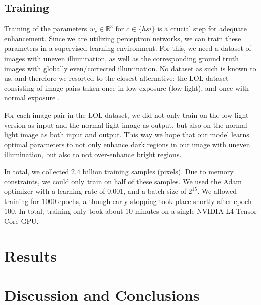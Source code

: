 \documentclass[sigconf]{acmart}
\begin{document}
\begin{mdframed}[backgroundcolor=backcolour,leftmargin=0cm,hidealllines=true,innerleftmargin=0cm,innerrightmargin=0cm,innertopmargin=0cm,innerbottommargin=-0.65cm]

\end{mdframed}

\subsection{Training}\label{sec:training}
Training of the parameters $w_{c} \in \mathbb{R}^3$ for $c \in \{hsi\}$ is a crucial step for adequate enhancement. Since we are utilizing perceptron networks, we can train these parameters in a supervised learning environment. For this, we need a dataset of images with uneven illumination, as well as the corresponding ground truth images with globally even/corrected illumination. No dataset as such is known to us, and therefore we resorted to the closest alternative: the LOL-dataset consisting of image pairs taken once in low exposure (low-light), and once with normal exposure \cite{wei2018deep}.

For each image pair in the LOL-dataset, we did not only train on the low-light version as input and the normal-light image as output, but also on the normal-light image as both input and output. This way we hope that our model learns optimal parameters to not only enhance dark regions in our image with uneven illumination, but also to not over-enhance bright regions.

In total, we collected $2.4$ billion training samples (pixels). Due to memory constraints, we could only train on half of these samples. We used the Adam optimizer with a learning rate of $0.001$, and a batch size of $2^{15}$. We allowed training for $1000$ epochs, although early stopping took place shortly after epoch $100$. In total, training only took about $10$ minutes on a single NVIDIA L4 Tensor Core GPU.

\section{Results}\label{sec:results}


\section{Discussion and Conclusions}\label{sec:discussion}
\end{document}
